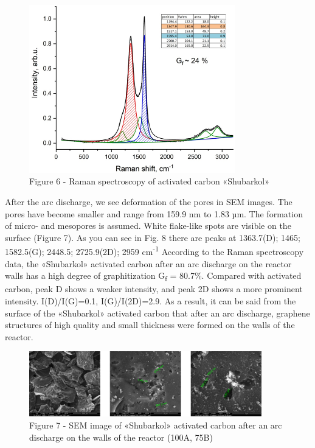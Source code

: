 \begin{figure}[H]
	\centering
	\includegraphics[width=0.8\textwidth]{assets/58}
	\caption*{Figure 6 - Raman spectroscopy of activated carbon «Shubarkol»}
\end{figure}

\begin{multicols}{2}
After the arc discharge, we see deformation of the pores in SEM images.
The pores have become smaller and range from 159.9 nm to 1.83 µm. The
formation of micro- and mesopores is assumed. White flake-like spots are
visible on the surface (Figure 7). As you can see in Fig. 8 there are
peaks at 1363.7(D); 1465; 1582.5(G); 2448.5; 2725.9(2D); 2959
cm\textsuperscript{-1} According to the Raman spectroscopy data, the
«Shubarkol» activated carbon after an arc discharge on the reactor walls
has a high degree of graphitization G\textsubscript{f} = 80.7\%.
Compared with activated carbon, peak D shows a weaker intensity, and
peak 2D shows a more prominent intensity. I(D)/I(G)=0.1, I(G)/I(2D)=2.9.
As a result, it can be said from the surface of the «Shubarkol»
activated carbon that after an arc discharge, graphene structures of
high quality and small thickness were formed on the walls of the
reactor.
\end{multicols}

\begin{figure}[H]
	\centering
	\includegraphics[width=0.9\textwidth]{assets/59}
	\caption*{Figure 7 - SEM image of «Shubarkol» activated carbon after an arc discharge on the walls of the reactor (100A, 75B)}
\end{figure}

